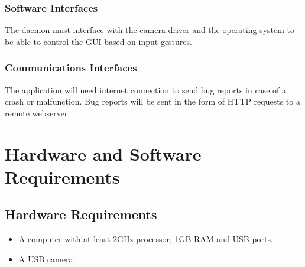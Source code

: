 \documentclass[11pt]{report}
\begin{document}
\subsection{Software Interfaces}
The daemon must interface with the camera driver and the operating system to be able to control the GUI based on input gestures.

\subsection{Communications Interfaces}
The application will need internet connection to send bug reports in case of a crash or malfunction. Bug reports will be sent in the form of HTTP requests to a remote webserver.

\chapter{Hardware and Software Requirements}
\section{Hardware Requirements}
\begin{itemize}
    \item A computer with at least 2GHz processor, 1GB RAM and USB ports.
    \item A USB camera.
\end{itemize}
\end{document}
